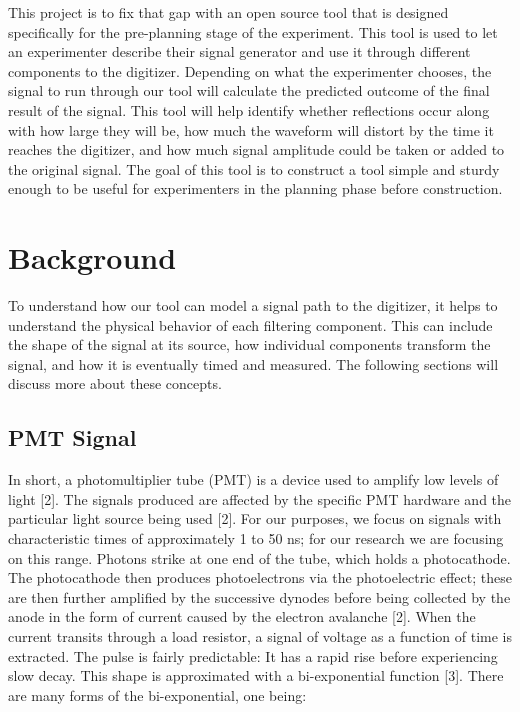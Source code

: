 \documentclass[10pt]{article}
\begin{document}
This project is to fix that gap with an open source tool that is designed specifically for the pre-planning stage of the experiment. This tool is used to let an experimenter describe their signal generator and use it through different components to the digitizer. Depending on what the experimenter chooses, the signal to run through our tool will calculate the predicted outcome of the final result of the signal. This tool will help identify whether reflections occur along with how large they will be, how much the waveform will distort by the time it reaches the digitizer, and how much signal amplitude could be taken or added to the original signal. The goal of this tool is to construct a tool simple and sturdy enough to be useful for experimenters in the planning phase before construction.
\section{Background}

To understand how our tool can model a signal path to the digitizer, it helps to understand the physical behavior of each filtering component. This can include the shape of the signal at its source, how individual components transform the signal, and how it is eventually timed and measured. The following sections will discuss more about these concepts.

\subsection{PMT Signal}
In short, a photomultiplier tube (PMT) is a device used to amplify low levels of light [2]. The signals produced are affected by the specific PMT hardware and the particular light source being used [2]. For our purposes, we focus on signals with characteristic times of approximately 1 to 50 ns; for our research we are focusing on this range. Photons strike at one end of the tube, which holds a photocathode. The photocathode then produces photoelectrons via the photoelectric effect; these are then further amplified by the successive dynodes before being collected by the anode in the form of current caused by the electron avalanche [2]. When the current transits through a load resistor, a signal of voltage as a function of time is extracted. The pulse is fairly predictable: It has a rapid rise before experiencing slow decay. This shape is approximated with a bi-exponential function [3]. There are many forms of the bi-exponential, one being:
\end{document}
